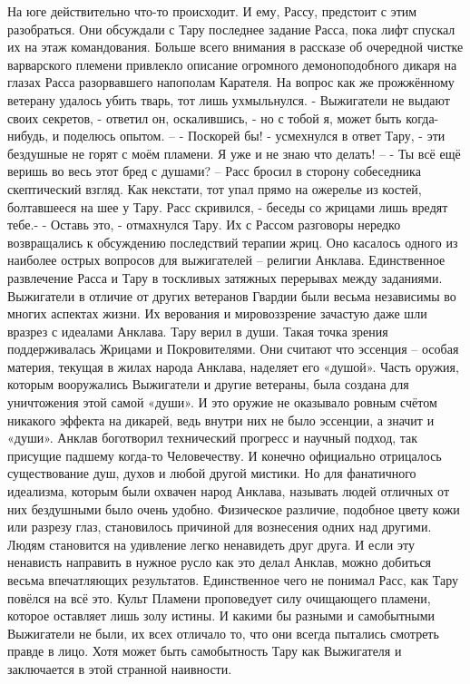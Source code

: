 \documentclass[a4paper, 12pt]{report}
\begin{document}
На юге действительно что-то происходит. И ему, Рассу, предстоит с этим разобраться.
Они обсуждали с Тару последнее задание Расса, пока лифт спускал их на этаж командования. Больше всего внимания в рассказе об очередной чистке варварского племени привлекло описание огромного демоноподобного дикаря на глазах Расса разорвавшего напополам Карателя. На вопрос как же прожжённому ветерану удалось убить тварь, тот лишь ухмыльнулся.
- Выжигатели не выдают своих секретов, - ответил он, оскалившись, - но с тобой я, может быть когда-нибудь, и поделюсь опытом. –
- Поскорей бы! - усмехнулся в ответ Тару, - эти бездушные не горят с моём пламени. Я уже и не знаю что делать! –
- Ты всё ещё веришь во весь этот бред с душами? – Расс бросил в сторону собеседника скептический взгляд. Как некстати, тот упал прямо на ожерелье из костей, болтавшееся на шее у Тару. Расс скривился, - беседы со жрицами лишь вредят тебе.-
- Оставь это, -  отмахнулся Тару. Их с Рассом разговоры нередко возвращались к обсуждению последствий терапии жриц. Оно касалось одного из наиболее острых вопросов для выжигателей – религии Анклава. Единственное развлечение Расса и Тару в тоскливых затяжных перерывах между заданиями. 
Выжигатели в отличие от других ветеранов Гвардии были весьма независимы во многих аспектах жизни. Их верования и мировоззрение зачастую даже шли вразрез с идеалами Анклава. Тару верил в души. Такая точка зрения поддерживалась Жрицами и Покровителями. Они считают что эссенция – особая материя, текущая в жилах народа Анклава, наделяет его «душой». Часть оружия, которым вооружались Выжигатели и другие ветераны, была создана для уничтожения этой самой «души». И это оружие не оказывало ровным счётом никакого эффекта на дикарей, ведь внутри них не было эссенции, а значит и «души». Анклав боготворил технический прогресс и научный подход, так присущие падшему когда-то Человечеству. И конечно официально отрицалось существование душ, духов и любой другой мистики. Но для фанатичного идеализма, которым были охвачен народ Анклава, называть людей отличных от них бездушными было очень удобно. Физическое различие, подобное цвету кожи или разрезу глаз, становилось причиной для  вознесения одних над другими. Людям становится на удивление легко ненавидеть друг друга. И если эту ненависть направить в нужное русло как это делал Анклав, можно добиться весьма впечатляющих результатов. 
Единственное чего не понимал Расс, как Тару повёлся на всё это. Культ Пламени проповедует силу очищающего пламени, которое оставляет лишь золу истины. И какими бы разными и самобытными Выжигатели не были, их всех отличало то, что они всегда пытались смотреть правде в лицо. Хотя может быть самобытность Тару как Выжигателя и заключается в этой странной наивности.
\end{document}
